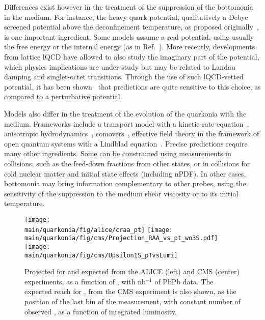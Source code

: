 \documentclass[../report.tex]{subfiles}
\providecommand{\main}{..}
\begin{document}
Differences exist however in the treatment of the suppression of the bottomonia in the medium.
For instance, the heavy quark potential, qualitatively a Debye screened potential above the deconfinement temperature, as proposed originally~\cite{Matsui:1986dk}, is one important
ingredient. Some models assume a real potential, using usually the free energy or the internal energy (as in Ref.~\cite{Du:2017qkv}). More recently, developments from lattice lQCD
have allowed to also study the imaginary part of the potential, which physics implications are under study but may be related to Landau damping and singlet-octet transitions. Through the 
use of such lQCD-vetted potential, it has been shown~\cite{Krouppa:2017jlg} that predictions are quite sensitive to this choice, as compared to a perturbative potential. 

Models also differ in the treatment of the evolution of the quarkonia with the medium. Frameworks include a transport model with a kinetic-rate equation~\cite{Du:2017qkv},
anisotropic hydrodynamics~\cite{Krouppa:2017jlg}, comovers~\cite{Ferreiro:2018wbd}, effective field theory in the framework of open quantum systems with 
a Lindblad equation~\cite{Brambilla:2017zei}. Precise predictions require many other ingredients. Some can be constrained using measurements in \pp collisions, such as
the feed-down fractions from other states, or in \pPb collisions for cold nuclear matter and initial state effects (including nPDF). In other cases, bottomonia may bring information
complementary to other probes, using the sensitivity of the suppression to the medium shear viscosity or to its initial temperature.

\begin{figure}
\begin{center}
 \texttt{[image: \\main/quarkonia/fig/alice/craa\_pt]}
 \texttt{[image: \\main/quarkonia/fig/cms/Projection\_RAA\_vs\_pt\_wo3S.pdf]}
 \texttt{[image: \\main/quarkonia/fig/cms/Upsilon1S\_pTvsLumi]}
\end{center}

 \caption{Projected \raa for \PgUa and \PgUb expected from the ALICE (left) and CMS (center) experiments, as a function of \pt, with \unit[10]{nb}$^{-1}$ of PbPb data. The expected \pt reach for \PgUa, from the CMS experiment is
 also shown, as the position of the last \pt bin of the measurement, with constant number of observed \PgUa, as a function of integrated luminosity.
 }
 \label{fig:upsi_raa_pt}
\end{figure}
\end{document}

